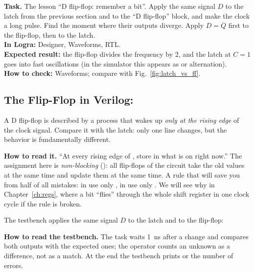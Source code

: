 \begin{diybox}
\textbf{Task.}  The lesson ``D flip-flop: remember a bit''.  Apply
the same signal $D$ to the latch from the previous section and to the ``D
flip-flop'' block, and make the clock a long pulse. Find the moment where their
outputs diverge.
 Apply $D=\overline{Q}$ first to the flip-flop, then to the latch.\\
\textbf{In Logra:} Designer, Waveforms, RTL.\\
\textbf{Expected result:} the flip-flop divides the frequency by 2, and the latch
at $C=1$ goes into fast oscillations (in the simulator this appears as  or
alternation).\\
\textbf{How to check:} Waveforms; compare with Fig.~\ref{fig:latch_vs_ff}.
\end{diybox}

\subsection{The Flip-Flop in Verilog: }
\label{sec:ff-dff-v}

A D flip-flop is described by a process that wakes up \emph{only at the rising
edge} of the clock signal. Compare it with the latch: only one line changes, but
the behavior is fundamentally different.


\textbf{How to read it.} ``At every rising edge of , store in 
what is on  right now.'' The assignment here is \emph{non-blocking}
(\code{<=}): all flip-flops of the circuit take the old values at the same time
and update them at the same time. A rule that will save you from half of all
mistakes: in  use only \code{<=}, in 
use only \code{=}. We will see why in Chapter~\ref{ch:regs}, where a bit ``flies''
through the whole shift register in one clock cycle if the rule is broken.

The testbench  applies the same signal $D$ to the latch
and to the flip-flop:


\textbf{How to read the testbench.} The task  waits 1~ns after a change
and compares both outputs with the expected ones; the operator \code{!==} counts
an unknown  as a difference, not as a match. At the end the testbench
prints  or the number of errors.

